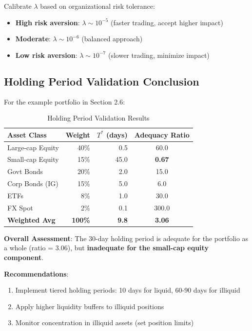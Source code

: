 \documentclass[11pt,a4paper]{article}
\begin{document}
Calibrate $\lambda$ based on organizational risk tolerance:

\begin{itemize}
    \item \textbf{High risk aversion}: $\lambda \sim 10^{-5}$ (faster trading, accept higher impact)
    \item \textbf{Moderate}: $\lambda \sim 10^{-6}$ (balanced approach)
    \item \textbf{Low risk aversion}: $\lambda \sim 10^{-7}$ (slower trading, minimize impact)
\end{itemize}

\subsection{Holding Period Validation Conclusion}

For the example portfolio in Section 2.6:

\begin{table}[h]
\centering
\caption{Holding Period Validation Results}
\begin{tabular}{@{}lrrc@{}}
\toprule
Asset Class & Weight & $T^*$ (days) & Adequacy Ratio \\
\midrule
Large-cap Equity & 40\% & 0.5 & 60.0 \\
Small-cap Equity & 15\% & 45.0 & \textbf{0.67} \\
Govt Bonds & 20\% & 2.0 & 15.0 \\
Corp Bonds (IG) & 15\% & 5.0 & 6.0 \\
ETFs & 8\% & 1.0 & 30.0 \\
FX Spot & 2\% & 0.1 & 300.0 \\
\midrule
\textbf{Weighted Avg} & \textbf{100\%} & \textbf{9.8} & \textbf{3.06} \\
\bottomrule
\end{tabular}
\end{table}

\textbf{Overall Assessment}: The 30-day holding period is adequate for the portfolio as a whole (ratio = 3.06), but \textbf{inadequate for the small-cap equity component}.

\textbf{Recommendations}:
\begin{enumerate}
    \item Implement tiered holding periods: 10 days for liquid, 60-90 days for illiquid
    \item Apply higher liquidity buffers to illiquid positions
    \item Monitor concentration in illiquid assets (set position limits)
\end{enumerate}
\end{document}
